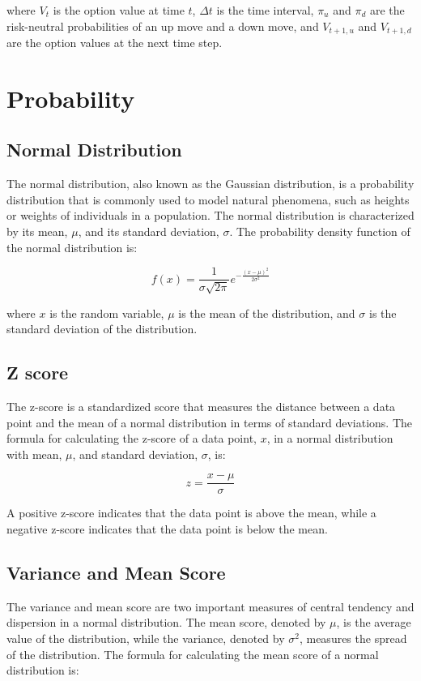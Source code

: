\documentclass{article}
\theoremstyle{mytheoremstyle}
\theoremstyle{mytheoremstyle}
\theoremstyle{myproblemstyle}
\begin{document}
where $V_t$ is the option value at time $t$, $\Delta t$ is the time interval, $\pi_u$ and $\pi_d$ are the risk-neutral probabilities of an up move and a down move, and $V_{t+1,u}$ and $V_{t+1,d}$ are the option values at the next time step.





\section{Probability}

\subsection{Normal Distribution}
The normal distribution, also known as the Gaussian distribution, is a probability distribution that is commonly used to model natural phenomena, such as heights or weights of individuals in a population. The normal distribution is characterized by its mean, $\mu$, and its standard deviation, $\sigma$. The probability density function of the normal distribution is:

\begin{equation}
f(x) = \frac{1}{\sigma\sqrt{2\pi}}e^{-\frac{(x-\mu)^2}{2\sigma^2}}
\end{equation}

where $x$ is the random variable, $\mu$ is the mean of the distribution, and $\sigma$ is the standard deviation of the distribution.

\subsection{Z score}
The z-score is a standardized score that measures the distance between a data point and the mean of a normal distribution in terms of standard deviations. The formula for calculating the z-score of a data point, $x$, in a normal distribution with mean, $\mu$, and standard deviation, $\sigma$, is:

\begin{equation}
z = \frac{x-\mu}{\sigma}
\end{equation}

A positive z-score indicates that the data point is above the mean, while a negative z-score indicates that the data point is below the mean.

\subsection{Variance and Mean Score}
The variance and mean score are two important measures of central tendency and dispersion in a normal distribution. The mean score, denoted by $\mu$, is the average value of the distribution, while the variance, denoted by $\sigma^2$, measures the spread of the distribution. The formula for calculating the mean score of a normal distribution is:
\end{document}

